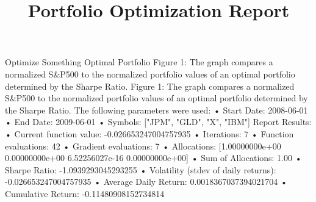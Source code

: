 \documentclass{article}
\begin{document}
\title{Portfolio Optimization Report}
\author{}
\date{}
\maketitle

Optimize Something
Optimal Portfolio
Figure 1: The graph compares a normalized S\&P500 to the normalized portfolio values of an optimal portfolio determined by the Sharpe Ratio.
Figure 1: The graph compares a normalized S\&P500 to the normalized portfolio values of an optimal portfolio determined by the Sharpe Ratio.
The following parameters were used:
	•	Start Date: 2008-06-01
	•	End Date: 2009-06-01
	•	Symbols: ["JPM", "GLD", "X", "IBM"]
Report Results:
	•	Current function value: -0.026653247004757935
	•	Iterations: 7
	•	Function evaluations: 42
	•	Gradient evaluations: 7
	•	Allocations: [1.00000000e+00 0.00000000e+00 6.52256027e-16 0.00000000e+00]
	•	Sum of Allocations: 1.00
	•	Sharpe Ratio: -1.0939293045293255
	•	Volatility (stdev of daily returns): -0.026653247004757935
	•	Average Daily Return: 0.0018367037394021704
	•	Cumulative Return: -0.11480908152734814\\
\end{document}
